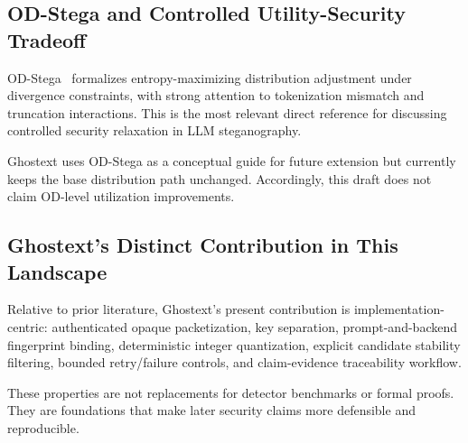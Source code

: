 \subsection{OD-Stega and Controlled Utility-Security Tradeoff}

OD-Stega~\cite{huang2026odstega} formalizes entropy-maximizing distribution adjustment under divergence constraints, with strong attention to tokenization mismatch and truncation interactions. This is the most relevant direct reference for discussing controlled security relaxation in LLM steganography.

Ghostext uses OD-Stega as a conceptual guide for future extension but currently keeps the base distribution path unchanged. Accordingly, this draft does not claim OD-level utilization improvements.

\subsection{Ghostext's Distinct Contribution in This Landscape}

Relative to prior literature, Ghostext's present contribution is implementation-centric: authenticated opaque packetization, key separation, prompt-and-backend fingerprint binding, deterministic integer quantization, explicit candidate stability filtering, bounded retry/failure controls, and claim-evidence traceability workflow.

These properties are not replacements for detector benchmarks or formal proofs. They are foundations that make later security claims more defensible and reproducible.

